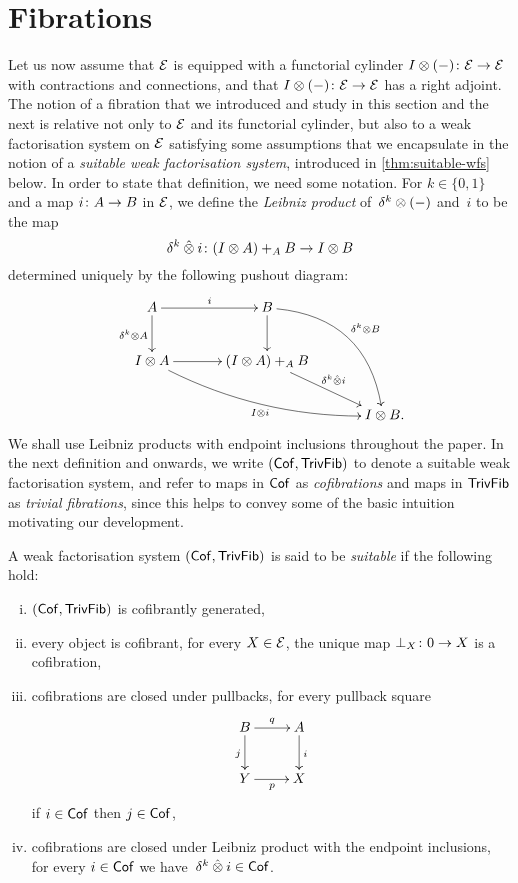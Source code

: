 \documentclass[reqno,10pt,a4paper,oneside,draft]{amsart}
\begin{document}
\section{Fibrations} 
\label{sec:fib}

Let us now assume that $\catE$ is equipped with a functorial cylinder $\interval\otimes (-) \co \catE \to \catE$ with contractions and connections, and that 
$\interval\otimes (-) \co \catE \to \catE$ has a right adjoint. 
The notion of a fibration that we introduced and study in this section and the next is relative not only to $\cal{E}$ and its functorial cylinder,
but also to a weak factorisation system on $\cal{E}$ satisfying some assumptions that we encapsulate in the notion of a \emph{suitable
weak factorisation system}, introduced in \cref{thm:suitable-wfs} below. In order to state that definition, we need some notation.  
For $k \in \{ 0, 1\}$ and a map $i \co A \to B$ in $\catE$, we define the \emph{Leibniz product} of~$\kcyl \otimes (-)$ and~$i$ to be the map 
\[
\kcyl \hatotimes i \co (\interval \otimes A) +_A B \to \interval \otimes B
\] 
determined uniquely by the following pushout diagram:
\begin{gather*}
\xymatrix@C=1.2cm{
  A
  \ar[r]^{i}
  \ar[d]_{\kcyl \otimes A}
&
  B
  \ar@/^2pc/[ddr]^{\kcyl \otimes B}
  \ar[d]
&\\
  \interval \otimes A
  \ar@/_1pc/[drr]_{\interval \otimes i}
  \ar[r]
&
  (\interval \otimes A) +_A B
  \ar[dr]^-{\delta^k \hatotimes i}
&\\&&
  \interval \otimes B
\rlap{.}}
\end{gather*}
We shall use Leibniz products with endpoint inclusions throughout the paper. In the next definition and onwards, we write
$(\Cof, \TrivFib)$ to denote a suitable weak factorisation system, and refer to maps in $\Cof$ as \emph{cofibrations} and maps in 
$\TrivFib$ as \emph{trivial fibrations}, since this helps to convey some of the basic intuition motivating our development. 

\newcommand{\Cyl}{\mathsf{Cyl}}

\begin{definition} \label{thm:suitable-wfs} A weak factorisation system $(\Cof, \TrivFib)$ is said to be \emph{suitable} if the following hold:
\begin{enumerate}[(i)]
 \item $(\Cof, \TrivFib)$  is cofibrantly generated,
\item every object is cofibrant, \ie for every $X \in \cal{E}$, the unique map $\bot_X \co 0 \to X$ is a cofibration, 
 \item cofibrations are closed under pullbacks, \ie for every pullback square
\[
\xymatrix{
B \ar[d]_j \ar[r]^q & A \ar[d]^i \\
Y \ar[r]_p & X }
\]
if $i \in \Cof$ then $j \in \Cof$, 
\item cofibrations are closed under Leibniz product with the endpoint inclusions, \ie for every $i \in \Cof$ we 
have~$\kcyl \hatotimes i \in \Cof$.
\end{enumerate}
\end{definition}
\end{document}
